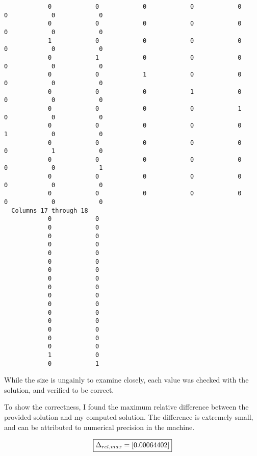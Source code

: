 \documentclass[]{article}
\begin{document}
\begin{lstlisting}
            0            0            0            0            0            0            0            0
            0            0            0            0            0            0            0            0
            1            0            0            0            0            0            0            0
            0            1            0            0            0            0            0            0
            0            0            1            0            0            0            0            0
            0            0            0            1            0            0            0            0
            0            0            0            0            1            0            0            0
            0            0            0            0            0            1            0            0
            0            0            0            0            0            0            1            0
            0            0            0            0            0            0            0            1
            0            0            0            0            0            0            0            0
            0            0            0            0            0            0            0            0
  Columns 17 through 18
            0            0
            0            0
            0            0
            0            0
            0            0
            0            0
            0            0
            0            0
            0            0
            0            0
            0            0
            0            0
            0            0
            0            0
            0            0
            0            0
            1            0
            0            1
\end{lstlisting}



While the size is ungainly to examine closely, each value was checked with the solution, and verified to be correct. 

To show the correctness, I found the maximum relative difference between the provided solution and my computed solution. The difference is extremely small, and can be attributed to numerical precision in the machine. 

\begin{displaymath}
	\boxed{ \Large
\Delta_{rel,max} 
=
[0.00064402]
}
\end{displaymath}



\end{document}
